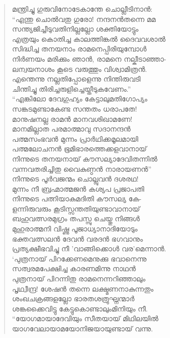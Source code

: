 \begin{verse}
മന്ത്രിച്ചു ഗുരുവിനോടേകാന്തേ ചൊല്ലീടിനാന്‍:\\
“എന്തു ചൊല്‍വതു ഗുരോ! നന്ദനന്‍തന്നെ മമ\\
സന്ത്യജിച്ചീടുവതിനില്ലല്ലോ ശക്തിയോട്ടും\\
എത്രയും കൊതിച്ച കാലത്തിങ്കല്‍ ദൈവവശാല്‍\\
സിദ്ധിച്ച തനയനാം രാമനെപ്പിരിയുമ്പോള്‍\\
നിര്‍ണയം മരിക്കും ഞാന്‍, രാമനെ നല്കീടാഞ്ഞാ-\\
ലന്വയനാശം കൂടെ വരുത്തും വിശ്വാമിത്രന്‍.\\
എന്തെന്നു നല്ലതിപ്പോളെന്നു നിന്തിരുവടി\\
ചിന്തിച്ചു തിരിച്ചരുളിച്ചെയ്തീടുകവേണം.”\\
“എങ്കിലോ ദേവഗുഹ്യം കേട്ടാലുമതിഗോപ്യം\\
സങ്കടമുണ്ടാകേണ്ട സന്തതം ധരാപതേ!\\
മാനുഷനല്ല രാമന്‍ മാനവശിഖാമണേ!\\
മാനമില്ലാത പരമാത്മാവു സദാനന്ദന്‍\\
പത്മസംഭവന്‍ മുന്നം പ്രാര്‍ഥിക്കമൂലമായി\\
പത്മലോചനന്‍ ഭൂമിഭാരത്തെക്കളവാനായ്\\
നിന്നുടെ തനയനായ് കൗസല്യാദേവിതന്നില്‍\\
വന്നവതരിച്ചിതു വൈകുണ്ഠന്‍ നാരായണന്‍”\\
നിന്നുടെ പൂര്‍വജന്മം ചൊല്ലുവന്‍ ദശരഥ!\\
മുന്നം നീ ബ്രഹ്മാത്മജന്‍ കശ്യപ പ്രജാപതി\\
നിന്നുടെ പത്നിയാകുമദിതി കൗസല്യ കേ-\\
ളന്നിരുവരും കൂടിസ്സന്തതിയുണ്ടാവാനായ്\\
ബഹുവത്സരമുഗ്രം തപസ്സു ചെയ്തു നിങ്ങള്‍\\
മുഹുരാത്മനി വിഷ്ണു പൂജാധ്യാനാദിയോടും\\
ഭക്തവത്സലന്‍ ദേവന്‍ വരദന്‍ ഭഗവാനും\\
പ്രത്യക്ഷീഭവിച്ചു നീ ’വാങ്ങിക്കൊള്‍ വര’മെന്നാന്‍.\\
‘പുത്രനായ് പിറക്കേണമെനുക്കു ഭവാനെന്നു\\
സത്വരമപേക്ഷിച്ച കാരണമിന്നു നാഥന്‍\\
പുത്രനായ് പിറന്നിതു രാമനെന്നറിഞ്ഞാലും\\
പൃഥ്വീന്ദ്ര! ശേഷന്‍ തന്നെ ലക്ഷ്മണനാകുന്നതും\\
ശംഖചക്രങ്ങളല്ലോ ഭാരതശത്രുഘ്നന്മാര്‍\\
ശങ്കക്കൈവിട്ടു കേട്ടുകൊണ്ടാലുംമിനിയും നീ.\\
“യോഗമായാദേവിയും സീതയായ് മിഥിലയില്‍\\
യാഗവേലായാമയോനിജയായുണ്ടായ് വന്നു.\\

\end{verse}
